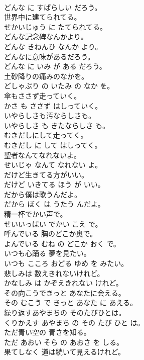 \documentclass[8pt]{extreport}
\begin{document}
\begin{CJK}{UTF8}{min}
\\	どんな に すばらしい だろう。	
\\	世界中に建てられてる。	
\\	せかいじゅう に たてられてる。	
\\	どんな記念碑なんかより。	
\\	どんな きねんひ なんか より。	
\\	どんなに意味があるだろう。	
\\	どんな に いみ が ある だろう。	
\\	土砂降りの痛みのなかを。	
\\	どしゃぶり の いたみ の なか を。	
\\	傘もささず走っていく。	
\\	かさ も ささず はしっていく。	
\\	いやらしさも汚ならしさも。	
\\	いやらしさ も きたならしさ も。	
\\	むきだしにして走ってく。	
\\	むきだし に して はしってく。	
\\	聖者なんてなれないよ。	
\\	せいじゃ なんて なれない よ。	
\\	だけど生きてる方がいい。	
\\	だけど いきてる ほう が いい。	
\\	だから僕は歌うんだよ。	
\\	だから ぼく は うたう んだよ。	
\\	精一杯でかい声で。	
\\	せいいっぱい でかい こえ で。	
\\	呼んでいる 胸のどこか奥で。	
\\	よんでいる むね の どこか おく で。	
\\	いつも心踊る 夢を見たい。	
\\	いつも こころ おどる ゆめ を みたい。	
\\	悲しみは 数えきれないけれど。	
\\	かなしみ は かぞえきれない けれど。	
\\	その向こうできっと あなたに会える。	
\\	その むこう で きっと あなた に あえる。	
\\	繰り返すあやまちの そのたびひとは。	
\\	くりかえす あやまち の その たび ひと は。	
\\	ただ青い空の 青さを知る。	
\\	ただ あおい そら の あおさ を しる。	
\\	果てしなく 道は続いて見えるけれど。	

\end{CJK}
\end{document}
